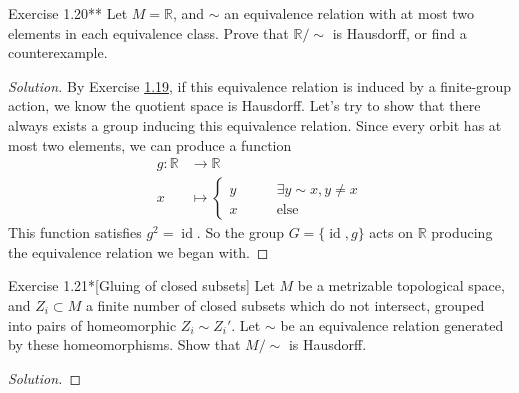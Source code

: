 \begin{thing4}{Exercise 1.20**}\label{exer:1.20}\leavevmode
Let $M=\mathbb{R}$, and $\sim$ an equivalence relation with at most two elements in each equivalence class. Prove that $\mathbb{R}/\sim$ is Hausdorff, or find a counterexample.
\end{thing4}

\begin{proof}[Solution]\leavevmode
By Exercise \hyperref[exer:1.19]{1.19}, if this equivalence relation is induced by a finite-group action, we know the quotient space is Hausdorff. Let's try to show that there always exists a group inducing this equivalence relation. Since every orbit has at most two elements, we can produce a function
\begin{align*}
	g: \mathbb{R} &\longrightarrow \mathbb{R} \\
	x &\longmapsto \begin{cases}
		y\qquad &\exists y\sim x,y \neq x \\
		x\qquad & \text{else} 
	\end{cases} 
\end{align*}
This function satisfies $g^2=\operatorname{id}$. So the group $G=\{\operatorname{id},g\}$ acts on $\mathbb{R}$ producing the equivalence relation we began with.
\end{proof}

\begin{thing4}{Exercise 1.21*}[Gluing of closed subsets]\label{exer:1.21}\leavevmode
Let $M$ be a metrizable topological space, and $Z_i \subset M$ a finite number of closed subsets which do not intersect, grouped into pairs of homeomorphic $Z_i \sim Z_i'$. Let $\sim$ be an equivalence relation generated by these homeomorphisms. Show that $M/\sim$ is Hausdorff.
\end{thing4}

\begin{proof}[Solution]\leavevmode

\end{proof}







